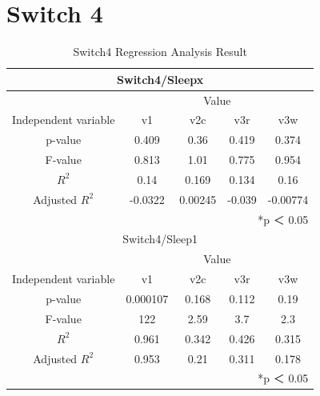 \documentclass[11pt
  , a4paper
  , article
  , oneside
]{memoir}
\begin{document}
\section{Switch 4}
\begin{table}[h!]
\begin{center}
\begin{tabular}{c|c||c||c||c}
\multicolumn{5}{c}{Switch4/Sleepx}\\ \hline\hline
\multicolumn{1}{c|}{}& \multicolumn{4}{c}{Value}\\
\cline{1-5}
Independent variable & v1 & v2c & v3r & v3w      \\ \hline\hline
p-value &  0.409 & 0.36 & 0.419 & 0.374\\ 
F-value &  0.813 & 1.01 & 0.775 & 0.954\\ 
$  R^2  $ & 0.14 & 0.169 & 0.134 & 0.16\\ 
Adjusted $  R^2  $ & -0.0322 & 0.00245 & -0.039 & -0.00774\\ \hline\hline
\multicolumn{5}{r}{*p ＜ 0.05} \\
\multicolumn{5}{c}{Switch4/Sleep1}\\ \hline\hline
\multicolumn{1}{c|}{}& \multicolumn{4}{c}{Value}\\
\cline{1-5}
Independent variable & v1 & v2c & v3r & v3w      \\ \hline\hline
p-value & 0.000107 & 0.168 & 0.112 & 0.19\\ 
F-value & 122 &  2.59&  3.7  &  2.3\\ 
$  R^2  $ & 0.961 & 0.342& 0.426 & 0.315\\ 
Adjusted $  R^2  $ & 0.953 & 0.21& 0.311 & 0.178\\ \hline\hline
\multicolumn{5}{r}{*p ＜ 0.05} \\ 
\end{tabular}
\caption{Switch4 Regression Analysis Result }
\end{center}
\end{table} 
\clearpage
\end{document}
